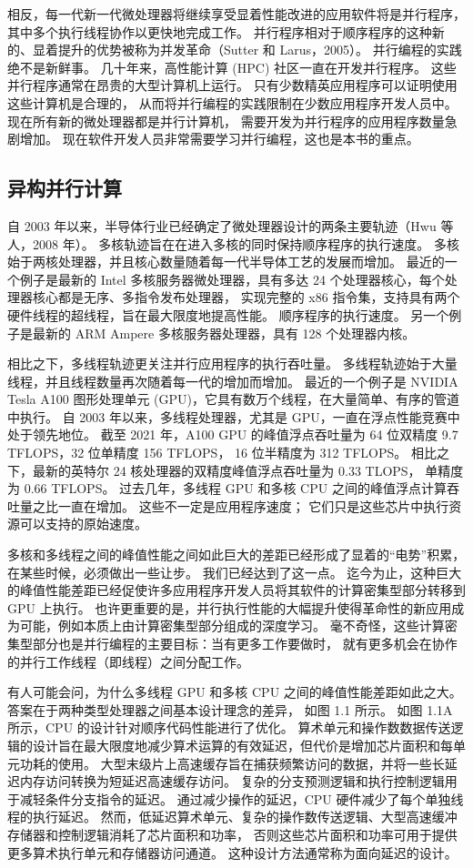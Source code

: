 相反，每一代新一代微处理器将继续享受显着性能改进的应用软件将是并行程序，其中多个执行线程协作以更快地完成工作。 
并行程序相对于顺序程序的这种新的、显着提升的优势被称为并发革命（Sutter 和 Larus，2005）。 
并行编程的实践绝不是新鲜事。 几十年来，高性能计算 (HPC) 社区一直在开发并行程序。 
这些并行程序通常在昂贵的大型计算机上运行。 只有少数精英应用程序可以证明使用这些计算机是合理的，
从而将并行编程的实践限制在少数应用程序开发人员中。 现在所有新的微处理器都是并行计算机，
需要开发为并行程序的应用程序数量急剧增加。 现在软件开发人员非常需要学习并行编程，这也是本书的重点。

\subsection{异构并行计算}
自 2003 年以来，半导体行业已经确定了微处理器设计的两条主要轨迹（Hwu 等人，2008 年）。 
多核轨迹旨在在进入多核的同时保持顺序程序的执行速度。 多核始于两核处理器，并且核心数量随着每一代半导体工艺的发展而增加。 
最近的一个例子是最新的 Intel 多核服务器微处理器，具有多达 24 个处理器核心，每个处理器核心都是无序、多指令发布处理器，
实现完整的 x86 指令集，支持具有两个硬件线程的超线程，旨在最大限度地提高性能。 顺序程序的执行速度。 
另一个例子是最新的 ARM Ampere 多核服务器处理器，具有 128 个处理器内核。

相比之下，多线程轨迹更关注并行应用程序的执行吞吐量。 多线程轨迹始于大量线程，并且线程数量再次随着每一代的增加而增加。 
最近的一个例子是 NVIDIA Tesla A100 图形处理单元 (GPU)，它具有数万个线程，在大量简单、有序的管道中执行。 
自 2003 年以来，多线程处理器，尤其是 GPU，一直在浮点性能竞赛中处于领先地位。
截至 2021 年，A100 GPU 的峰值浮点吞吐量为 64 位双精度 9.7 TFLOPS，32 位单精度 156 TFLOPS，
16 位半精度为 312 TFLOPS。 相比之下，最新的英特尔 24 核处理器的双精度峰值浮点吞吐量为 0.33 TLOPS，
单精度为 0.66 TFLOPS。 过去几年，多线程 GPU 和多核 CPU 之间的峰值浮点计算吞吐量之比一直在增加。 
这些不一定是应用程序速度； 它们只是这些芯片中执行资源可以支持的原始速度。

多核和多线程之间的峰值性能之间如此巨大的差距已经形成了显着的“电势”积累，在某些时候，必须做出一些让步。 
我们已经达到了这一点。 迄今为止，这种巨大的峰值性能差距已经促使许多应用程序开发人员将其软件的计算密集型部分转移到 
GPU 上执行。 也许更重要的是，并行执行性能的大幅提升使得革命性的新应用成为可能，例如本质上由计算密集型部分组成的深度学习。 
毫不奇怪，这些计算密集型部分也是并行编程的主要目标：当有更多工作要做时，
就有更多机会在协作的并行工作线程（即线程）之间分配工作。

有人可能会问，为什么多线程 GPU 和多核 CPU 之间的峰值性能差距如此之大。 答案在于两种类型处理器之间基本设计理念的差异，
如图 1.1 所示。 如图 1.1A 所示，CPU 的设计针对顺序代码性能进行了优化。 
算术单元和操作数数据传送逻辑的设计旨在最大限度地减少算术运算的有效延迟，但代价是增加芯片面积和每单元功耗的使用。 
大型末级片上高速缓存旨在捕获频繁访问的数据，并将一些长延迟内存访问转换为短延迟高速缓存访问。 
复杂的分支预测逻辑和执行控制逻辑用于减轻条件分支指令的延迟。 通过减少操作的延迟，CPU 硬件减少了每个单独线程的执行延迟。 
然而，低延迟算术单元、复杂的操作数传送逻辑、大型高速缓冲存储器和控制逻辑消耗了芯片面积和功率，
否则这些芯片面积和功率可用于提供更多算术执行单元和存储器访问通道。 这种设计方法通常称为面向延迟的设计。

